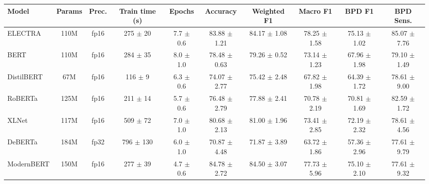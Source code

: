 \begin{tabular}{@{}lccccccccc@{}}
\toprule
\textbf{Model} & \textbf{Params} & \textbf{Prec.} & \textbf{Train time (s)} & \textbf{Epochs} & \textbf{Accuracy} & \textbf{Weighted F1} & \textbf{Macro F1} & \textbf{BPD F1} & \textbf{BPD Sens.} \\
\midrule
ELECTRA & 110M & fp16 & 275 $\pm$ 20 & 7.7 $\pm$ 0.6 & 83.88 $\pm$ 1.21 & 84.17 $\pm$ 1.08 & 78.25 $\pm$ 1.58 & 75.13 $\pm$ 1.02 & 85.07 $\pm$ 7.76 \\
BERT & 110M & fp16 & 284 $\pm$ 35 & 8.0 $\pm$ 1.0 & 78.48 $\pm$ 0.63 & 79.26 $\pm$ 0.52 & 73.14 $\pm$ 1.23 & 67.96 $\pm$ 1.98 & 79.10 $\pm$ 1.49 \\
DistilBERT & 67M & fp16 & 116 $\pm$ 9 & 6.3 $\pm$ 0.6 & 74.07 $\pm$ 2.77 & 75.42 $\pm$ 2.48 & 67.82 $\pm$ 1.98 & 64.39 $\pm$ 1.72 & 78.61 $\pm$ 9.00 \\
RoBERTa & 125M & fp16 & 211 $\pm$ 14 & 5.7 $\pm$ 0.6 & 76.48 $\pm$ 2.79 & 77.88 $\pm$ 2.41 & 70.78 $\pm$ 2.19 & 70.81 $\pm$ 1.69 & 82.59 $\pm$ 1.72 \\
XLNet & 117M & fp16 & 509 $\pm$ 72 & 7.0 $\pm$ 1.0 & 80.68 $\pm$ 2.13 & 81.00 $\pm$ 1.96 & 73.41 $\pm$ 2.85 & 72.19 $\pm$ 2.32 & 78.61 $\pm$ 4.56 \\
DeBERTa & 184M & fp32 & 796 $\pm$ 130 & 6.0 $\pm$ 1.0 & 70.87 $\pm$ 4.48 & 71.87 $\pm$ 3.89 & 63.72 $\pm$ 1.86 & 57.36 $\pm$ 2.96 & 77.61 $\pm$ 9.79 \\
ModernBERT & 150M & fp16 & 277 $\pm$ 39 & 4.7 $\pm$ 0.6 & 84.78 $\pm$ 2.72 & 84.50 $\pm$ 3.07 & 77.73 $\pm$ 5.96 & 75.10 $\pm$ 2.10 & 77.61 $\pm$ 9.32 \\
\bottomrule
\end{tabular}
